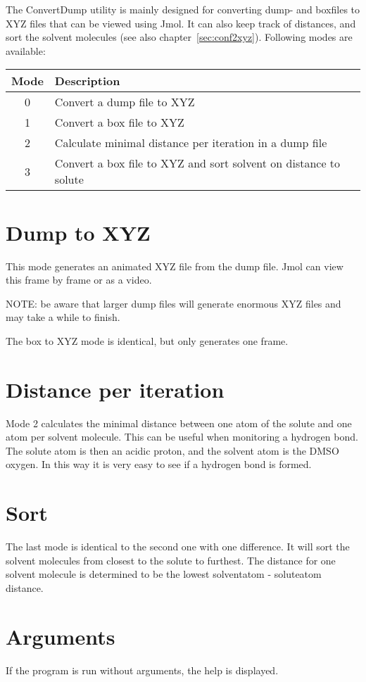 
The ConvertDump utility is mainly designed for converting dump- and boxfiles to 
XYZ files that can be viewed using Jmol. It can also keep track of distances, 
and sort the solvent molecules (see also chapter~\ref{sec:conf2xyz}). Following 
modes are available:

\begin{tabular}{cl}
	Mode & Description \\ \hline
	0 & Convert a dump file to XYZ \\
	1 & Convert a box file to XYZ \\
	2 & Calculate minimal distance per iteration in a dump file \\
	3 & Convert a box file to XYZ and sort solvent on distance to solute
\end{tabular}

\section{Dump to XYZ}
This mode generates an animated XYZ file from the dump file. Jmol can view this 
frame by frame or as a video.

NOTE: be aware that larger dump files will generate enormous XYZ files and may 
take a while to finish.

The box to XYZ mode is identical, but only generates one frame.

\section{Distance per iteration}
Mode 2 calculates the minimal distance between one atom of the solute and one 
atom per solvent molecule. This can be useful when monitoring a hydrogen bond. 
The solute atom is then an acidic proton, and the solvent atom is the DMSO 
oxygen. In this way it is very easy to see if a hydrogen bond is formed.

\section{Sort}
The last mode is identical to the second one with one difference. It will sort 
the solvent molecules from closest to the solute to furthest. The distance for 
one solvent molecule is determined to be the lowest solventatom - soluteatom 
distance.

\section{Arguments}
If the program is run without arguments, the help is displayed.

